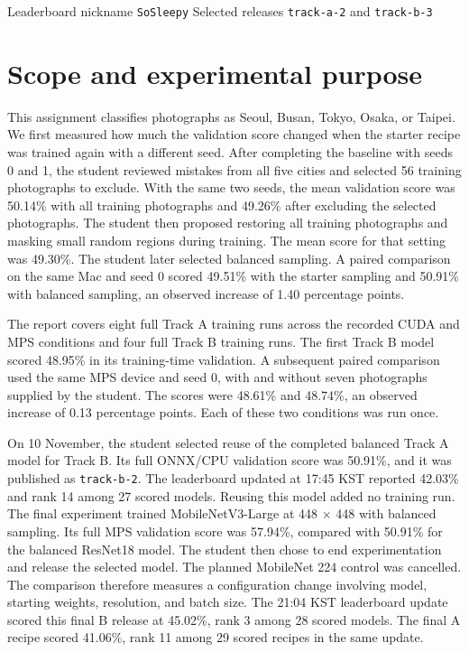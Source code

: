\documentclass[11pt]{article}
\begin{document}
\makeheader
{\small Leaderboard nickname \texttt{SoSleepy}\hfill
Selected releases \texttt{track-a-2} and \texttt{track-b-3}}\par

\section{Scope and experimental purpose}

This assignment classifies photographs as Seoul, Busan, Tokyo, Osaka, or Taipei.
We first measured how much the validation score changed when the starter recipe
was trained again with a different seed. After completing the baseline with
seeds 0 and 1, the student reviewed mistakes from all five cities and selected
56 training photographs to exclude. With the same two seeds, the mean
validation score was 50.14\% with all training photographs and 49.26\% after
excluding the selected photographs. The student then proposed restoring all
training photographs and masking small random regions during training.
The mean score for that setting was 49.30\%.
The student later selected balanced sampling. A paired comparison on the same
Mac and seed 0 scored 49.51\% with the starter sampling and 50.91\% with
balanced sampling, an observed increase of 1.40 percentage points.

The report covers eight full Track A training runs across the recorded CUDA
and MPS conditions and four full Track B training runs. The first Track B model scored 48.95\% in its
training-time validation. A subsequent paired comparison used the same MPS
device and seed 0, with and without seven photographs supplied by the student.
The scores were 48.61\% and 48.74\%, an observed increase of 0.13 percentage
points. Each of these two conditions was run once.

On 10 November, the student selected reuse of the completed balanced Track A
model for Track B. Its full ONNX/CPU validation score was 50.91\%, and it
was published as \texttt{track-b-2}. The leaderboard updated at 17:45 KST
reported 42.03\% and rank 14 among 27 scored models. Reusing this model
added no training run. The final experiment trained MobileNetV3-Large at
448 $\times$ 448 with balanced sampling. Its full MPS validation score
was 57.94\%, compared with 50.91\% for the balanced ResNet18 model.
The student then chose to end experimentation and release the selected
model. The planned MobileNet 224 control was cancelled. The comparison
therefore measures a configuration change involving model, starting
weights, resolution, and batch size.
The 21:04 KST leaderboard update scored this final B release at 45.02\%,
rank 3 among 28 scored models. The final A recipe scored 41.06\%,
rank 11 among 29 scored recipes in the same update.
\end{document}
